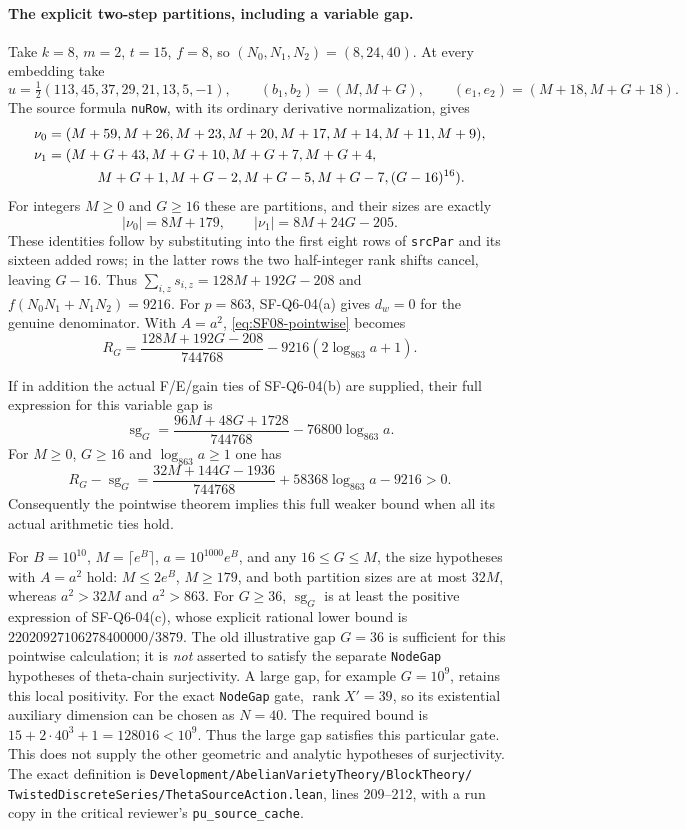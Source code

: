 \paragraph{The explicit two-step partitions, including a variable gap.}
Take $k=8$, $m=2$, $t=15$, $f=8$, so
$(N_0,N_1,N_2)=(8,24,40)$.  At every embedding take
\[
 u=\tfrac12(113,45,37,29,21,13,5,-1),\qquad
 (b_1,b_2)=(M,M+G),\qquad
 (e_1,e_2)=(M+18,M+G+18).
\]
The source formula \texttt{nuRow}, with its ordinary derivative
normalization, gives
\begin{align*}
 \nu_0={}&(M+59,M+26,M+23,M+20,M+17,M+14,M+11,M+9),\\
 \nu_1={}&(M+G+43,M+G+10,M+G+7,M+G+4,\\
          &\hspace{8mm}M+G+1,M+G-2,M+G-5,M+G-7,(G-16)^{16}).
\end{align*}
For integers $M\ge0$ and $G\ge16$ these are partitions, and their sizes are exactly
\[
 |\nu_0|=8M+179,\qquad |\nu_1|=8M+24G-205.
\]
These identities follow by substituting into the first eight rows
of \texttt{srcPar} and its sixteen added rows; in the latter rows
the two half-integer rank shifts cancel, leaving $G-16$.
Thus $\sum_{i,z}s_{i,z}=128M+192G-208$ and
$f(N_0N_1+N_1N_2)=9216$.
For $p=863$, SF-Q6-04(a) gives $d_w=0$ for the genuine denominator.
With $A=a^2$, \eqref{eq:SF08-pointwise} becomes
\begin{equation}\label{eq:SF08-explicit}
 R_G=\frac{128M+192G-208}{744768}
                      -9216(2\log_{863}a+1).
\end{equation}

If in addition the actual F/E/gain ties of SF-Q6-04(b) are supplied,
their full expression for this variable gap is
\[
 \operatorname{sg}_G
     =\frac{96M+48G+1728}{744768}-76800\log_{863}a.
\]
For $M\ge0$, $G\ge16$ and $\log_{863}a\ge1$ one has
\[
 R_G-\operatorname{sg}_G
 =\frac{32M+144G-1936}{744768}
                   +58368\log_{863}a-9216>0.
\]
Consequently the pointwise theorem implies this full weaker bound
when all its actual arithmetic ties hold.

For $B=10^{10}$, $M=\lceil e^B\rceil$,
$a=10^{1000}e^B$, and any $16\le G\le M$, the size hypotheses with
$A=a^2$ hold: $M\le2e^B$, $M\ge179$, and both partition sizes
are at most $32M$, whereas $a^2>32M$ and $a^2>863$.
For $G\ge36$, $\operatorname{sg}_G$ is at least the positive
expression of SF-Q6-04(c), whose explicit rational lower bound is
$22020927106278400000/3879$.
The old illustrative gap $G=36$ is sufficient for this pointwise
calculation; it is \emph{not} asserted to satisfy the separate
\texttt{NodeGap} hypotheses of theta-chain surjectivity.
A large gap, for example $G=10^9$, retains this local positivity.
For the exact \texttt{NodeGap} gate, $\operatorname{rank}X'=39$,
so its existential auxiliary dimension can be chosen as $N=40$.
The required bound is $15+2\cdot40^3+1=128016<10^9$.
Thus the large gap satisfies this particular gate.  This does not
supply the other geometric and analytic hypotheses of surjectivity.
The exact definition is
\texttt{Development/AbelianVarietyTheory/BlockTheory/}
\texttt{TwistedDiscreteSeries/ThetaSourceAction.lean}, lines 209--212,
with a run copy in the critical reviewer's \texttt{pu\_source\_cache}.

